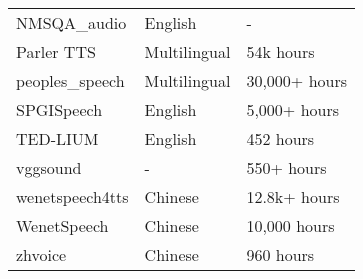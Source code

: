 \begin{table}[ht]
\begin{tabular}{l l l}
NMSQA\_audio & English & -   \\ 
Parler TTS & Multilingual & 54k hours  \\ 
peoples\_speech & Multilingual & 30,000+ hours   \\ 
SPGISpeech & English & 5,000+ hours   \\ 
TED-LIUM & English & 452 hours   \\ 
vggsound & - & 550+ hours   \\ 
wenetspeech4tts & Chinese & 12.8k+ hours   \\ 
WenetSpeech & Chinese & 10,000 hours   \\ 
zhvoice & Chinese & 960 hours   \\ 
\bottomrule
\end{tabular}

\end{table}


